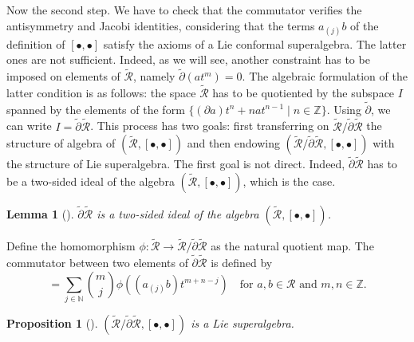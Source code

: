 \documentclass[a4paper, 12pt, reqno]{amsart}
\newtheorem{lemma}[theorem]{Lemma}
\newtheorem{proposition}[theorem]{Proposition}
\theoremstyle{remark}
\numberwithin{equation}{subsection}
\begin{document}
Now the second step.
We have to check that the commutator verifies the antisymmetry and Jacobi identities, considering that the terms $a_{(j)}b$ of the definition of $[\bullet, \bullet]$ satisfy the axioms of a Lie conformal superalgebra.
The latter ones are not sufficient.
Indeed, as we will see, another constraint has to be imposed on elements of $\widetilde{\mathcal{R}}$, namely $\widetilde{\partial}(at^m) = 0$.
The algebraic formulation of the latter condition is as follows: the space $\widetilde{\mathcal{R}}$ has to be quotiented by the subspace $I$ spanned by the elements of the form $\{(\partial a)t^n + nat^{n - 1} \mid n \in \mathbb{Z}\}$.
Using $\widetilde{\partial}$, we can write $I = \widetilde{\partial}\widetilde{\mathcal{R}}$.
This process has two goals: first transferring on $\widetilde{\mathcal{R}}/\widetilde{\partial}\widetilde{\mathcal{R}}$ the structure of algebra of $(\widetilde{\mathcal{R}}, [\bullet, \bullet])$ and then endowing $(\widetilde{\mathcal{R}}/\widetilde{\partial}\widetilde{\mathcal{R}}, [\bullet, \bullet])$ with the structure of Lie superalgebra.
The first goal is not direct.
Indeed, $\widetilde{\partial}\widetilde{\mathcal{R}}$ has to be a two-sided ideal of the algebra $(\widetilde{\mathcal{R}}, [\bullet, \bullet])$, which is the case.

\begin{lemma}[{\cite[Proposition 2.6.1]{nozaradan_introduction_2008}}]
  \label{lmm:1}
  $\widetilde{\partial}\widetilde{\mathcal{R}}$ is a two-sided ideal of the algebra $(\widetilde{\mathcal{R}}, [\bullet, \bullet])$.
\end{lemma}

Define the homomorphism $\phi: \widetilde{\mathcal{R}} \to \widetilde{\mathcal{R}}/\widetilde{\partial}\widetilde{\mathcal{R}}$ as the natural quotient map.
The commutator between two elements of $\widetilde{\partial}\widetilde{\mathcal{R}}$ is defined by
\begin{equation*}
  [\phi(at^m), \phi(bt^n)] = \sum_{j \in \mathbb{N}}\binom{m}{j}\phi((a_{(j)}b)t^{m + n - j}) \quad \text{for }a, b \in \mathcal{R}\text{ and }m, n \in \mathbb{Z}.
\end{equation*}

\begin{proposition}[{\cite[Proposition 2.6.3]{nozaradan_introduction_2008}}]
  \label{prp:5}
  $(\widetilde{\mathcal{R}}/\widetilde{\partial}\widetilde{\mathcal{R}}, [\bullet, \bullet])$ is a Lie superalgebra.
\end{proposition}
\end{document}
